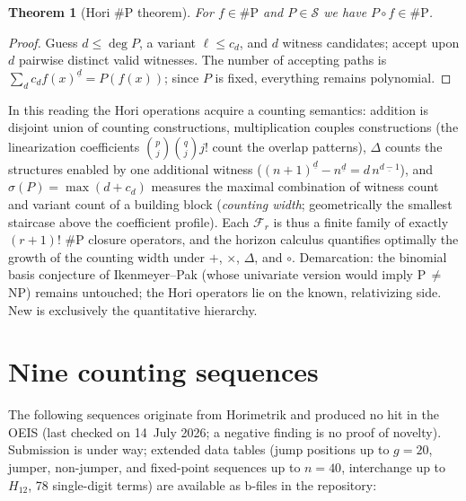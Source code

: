 \documentclass[11pt]{article}
\newtheorem{satz}{Theorem}[section]
\theoremstyle{definition}
\theoremstyle{remark}
\newcommand{\Struk}{\mathcal S}
\begin{document}
\begin{satz}[Hori \#P theorem]\label{satz:sharpp}
For $f\in\#\mathrm P$ and $P\in\Struk$ we have
$P\circ f\in\#\mathrm P$.
\end{satz}

\begin{proof}
Guess $d\le\deg P$, a variant $\ell\le c_d$, and $d$ witness
candidates; accept upon $d$ pairwise distinct valid witnesses. The
number of accepting paths is
$\sum_d c_d f(x)^{\underline d}=P(f(x))$; since $P$ is fixed,
everything remains polynomial.
\end{proof}

In this reading the Hori operations acquire a counting semantics:
addition is disjoint union of counting constructions,
multiplication couples constructions (the linearization
coefficients $\binom pj\binom qj j!$ count the overlap patterns),
$\Delta$ counts the structures enabled by one additional witness
($(n{+}1)^{\underline d}-n^{\underline d}=d\,n^{\underline{d-1}}$),
and $\sigma(P)=\max(d+c_d)$ measures the maximal combination of
witness count and variant count of a building block
(\emph{counting width}; geometrically the smallest staircase above
the coefficient profile). Each $\mathcal F_r$ is thus a finite
family of exactly $(r{+}1)!$ \#P closure operators, and the horizon
calculus quantifies optimally the growth of the counting width
under $+$, $\times$, $\Delta$, and $\circ$. Demarcation: the
binomial basis conjecture of Ikenmeyer--Pak (whose univariate
version would imply P$\,\ne\,$NP) remains untouched; the Hori
operators lie on the known, relativizing side.
New is exclusively the quantitative hierarchy.

\section{Nine counting sequences}

The following sequences originate from Horimetrik and produced no
hit in the OEIS (last checked on 14~July 2026; a negative finding
is no proof of novelty). Submission is under way; extended data
tables (jump positions up to $g=20$, jumper, non-jumper, and
fixed-point sequences up to $n=40$, interchange up to
$H_{12}$, 78 single-digit terms) are available as b-files in the
repository:
\end{document}
